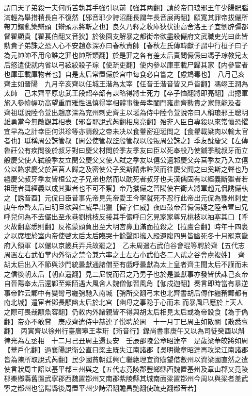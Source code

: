 謂曰天子弟殺一夫何所苦執其手強引以前【強其两翻】請於帝曰琅邪王年少腸肥腦滿輕為舉措稍長自不復然【邪音耶少詩沼翻長謂年長音展两翻】願寛其罪帝拔儼所帶刀鐶亂築辮頭【辮頭示將斬之也】良久乃釋之收庫狄伏連高舍洛王子宜劉辟彊都督翟顯貴【翟萇伯翻又音狄】於後園支解暴之都街帝欲盡殺儼府文武職吏光曰此皆勲貴子弟誅之恐人心不安趙彥深亦曰春秋責帥【春秋左氏傳韓獻子謂中行桓子曰子為元帥帥不用命誰之罪也帥所類翻】於是罪之各有差太后責問儼儼曰馮子琮教兒太后怒遣使就内省以弓絃絞殺子琮【使疏吏翻】使内參以庫車載尸歸其家【内參宦者也庫車載庫物者也】自是太后常置儼於宫中每食必自嘗之【慮鴆毒也】　八月己亥齊主如晉陽　九月辛亥齊以任城王湝為太宰【任音壬湝音皆又戶皆翻】馮翊王潤為太師　己未齊平原忠武王段韶卒韶有謀略得將士死力【卒子恤翻將即亮翻】出摠軍旅入參幃幄功高望重而雅性温慎得宰相體事後母孝閨門雍肅齊勲貴之家無能及者　齊祖珽說陸令萱出趙彦深為兖州刺史齊主以珽為侍中陸令萱說帝曰人稱琅邪王聰明雄勇當今無敵觀其相表【邪音耶說式芮翻相息亮翻】殆非人臣自專殺以來常懷恐懼宜早為之計幸臣何洪珍等亦請殺之帝未决以食轝密迎珽問之【食轝載粱肉以輸太官者也】珽稱周公誅管叔【周公使管叔監殷管叔以殷叛周公誅之】季友酖慶父【左傳魯莊公有疾問後於叔牙對曰慶父材問於季友季友曰臣以死奉般乃使鍼季酖叔牙而立般慶父使人弑般季友立閔公慶父又使人弑之季友以僖公適邾慶父奔莒季友乃入立僖公以賂求慶父於莒莒人歸之及密使公子奚斯請弗許哭而往慶父聞之曰奚斯之聲也乃縊慶父叔牙季友皆桓公之子兄弟也然而以酖死者叔牙也夫漢儒固有以經義斷獄者若祖珽者舞經義以成其獄者也不可不察】帝乃攜儼之晉陽使右衛大將軍趙元侃誘儼執之【誘音酉】元侃曰臣昔事先帝見先帝愛王今寧就死不忍行此帝出元侃為豫州刺史庚午帝啓太后曰明旦欲與仁威早出獵【儼字仁威】夜四鼓帝召儼儼疑之陸令萱曰兄呼兒何為不去儼出至永巷劉桃枝反接其手儼呼曰乞見家家尊兄桃枝以袖塞其口【呼火故翻塞悉則翻】反袍蒙頭負出至大明宮鼻血滿面拉殺之【拉盧合翻】時年十四裹之以席埋於室内帝使啓太后太后臨哭十餘聲即擁入殿遺腹四男皆幽死冬十月罷京畿府入領軍【以儼以京畿兵弄兵故罷之】　乙未周遣右武伯谷會琨等聘於齊【五代志周置左右武伯掌内外衛之禁令兼六率之士左右小武伯各二人貮之谷會虜複姓】　齊胡太后出入不節與沙門統曇獻通諸僧至有戱呼曇獻為太上皇者齊主聞太后不謹而未之信後朝太后【朝直遥翻】見二尼悦而召之乃男子也於是曇獻事亦發皆伏誅己亥帝自晉陽奉太后還鄴至紫陌遇大風舍人魏僧伽習風角【伽戍迦翻】奏言即時當有暴逆事帝詐云鄴中有變彎弓纒弰馳入南城【弰所交翻弓末也北齊書胡后傳作纒矟鄴都有南北城】遣宦者鄧長顒幽太后於北宫【幽母之事隐于心而未而暴風已應於上天人之際可畏哉顒魚容翻】仍敕内外諸親皆不得與胡太后相見太后或為帝設食【為于偽翻】帝亦不敢嘗　庚戍齊遣侍中赫連子悦聘於周　十一月丁巳周主如散關【散悉亶翻】　丙寅齊以徐州行臺廣寧王孝珩【珩音行】錄尚書事庚午又以為司徒癸酉以斛律光為左丞相　十二月己丑周主還長安　壬辰邵陵公章昭逹卒　是歲梁華皎將如周【華戶化翻】過襄陽說衛公直曰梁主既失江南諸郡【吳明徹章昭逹再攻梁江南諸郡皆為陳所取說式芮翻】民少國貧朝廷興亡繼絶理宜資贍望借數州以資梁國直然之遣使言狀周主詔以基平鄀三州與之【五代志竟陵郡豐鄉縣西魏置基州及章山郡又竟陵郡樂鄉縣舊置武寧郡西魏置鄀州又南郡紫陵縣其城南面梁置鄀州今周以與梁者盖武寧之鄀州也當陽縣後周置平州少詩沼翻贍昌艶翻使疏吏翻鄀音若】

